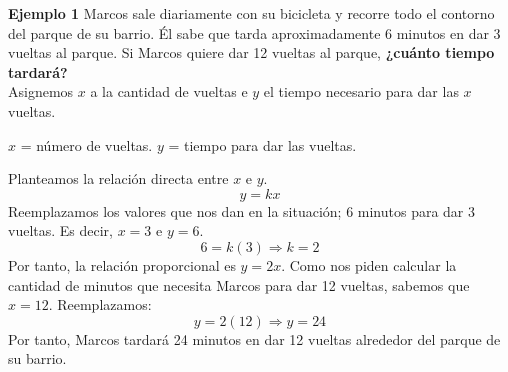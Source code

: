 {\color{brown}\textbf{Ejemplo 1}}
Marcos sale diariamente con su bicicleta y recorre todo el contorno del parque de su barrio. Él sabe que tarda aproximadamente 6 minutos en dar 3 vueltas al parque.
Si Marcos quiere dar 12 vueltas al parque,
\textbf{¿cuánto tiempo tardará?}\\

Asignemos $x$ a la cantidad de vueltas e $y$ el tiempo necesario para dar las $x$ vueltas.

\begin{center}
    $x$ = n\'umero de vueltas. \quad $y$ = tiempo para dar las vueltas.
\end{center}
Planteamos la relación directa entre $x$ e $y$.
\[y=kx\]
Reemplazamos los valores que nos dan en la situación; 6 minutos para dar 3 vueltas. Es decir, $x=3$ e $y=6$.
\[6=k(3) \Rightarrow k=2\]
Por tanto, la relación proporcional es $y=2x$.
Como nos piden calcular la cantidad de minutos que necesita Marcos para dar 12 vueltas, sabemos que $x=12$.
Reemplazamos:
\[y=2(12) \Rightarrow y=24\]
Por tanto, Marcos tardará 24 minutos en dar 12 vueltas alrededor del parque de su barrio.\\